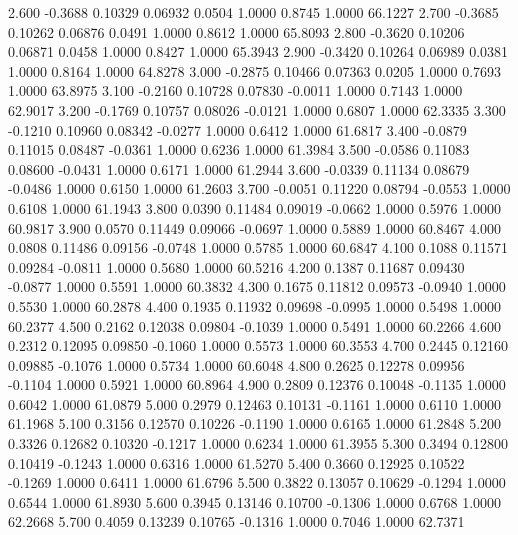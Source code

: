    2.600  -0.3688   0.10329   0.06932   0.0504   1.0000   0.8745   1.0000  66.1227
   2.700  -0.3685   0.10262   0.06876   0.0491   1.0000   0.8612   1.0000  65.8093
   2.800  -0.3620   0.10206   0.06871   0.0458   1.0000   0.8427   1.0000  65.3943
   2.900  -0.3420   0.10264   0.06989   0.0381   1.0000   0.8164   1.0000  64.8278
   3.000  -0.2875   0.10466   0.07363   0.0205   1.0000   0.7693   1.0000  63.8975
   3.100  -0.2160   0.10728   0.07830  -0.0011   1.0000   0.7143   1.0000  62.9017
   3.200  -0.1769   0.10757   0.08026  -0.0121   1.0000   0.6807   1.0000  62.3335
   3.300  -0.1210   0.10960   0.08342  -0.0277   1.0000   0.6412   1.0000  61.6817
   3.400  -0.0879   0.11015   0.08487  -0.0361   1.0000   0.6236   1.0000  61.3984
   3.500  -0.0586   0.11083   0.08600  -0.0431   1.0000   0.6171   1.0000  61.2944
   3.600  -0.0339   0.11134   0.08679  -0.0486   1.0000   0.6150   1.0000  61.2603
   3.700  -0.0051   0.11220   0.08794  -0.0553   1.0000   0.6108   1.0000  61.1943
   3.800   0.0390   0.11484   0.09019  -0.0662   1.0000   0.5976   1.0000  60.9817
   3.900   0.0570   0.11449   0.09066  -0.0697   1.0000   0.5889   1.0000  60.8467
   4.000   0.0808   0.11486   0.09156  -0.0748   1.0000   0.5785   1.0000  60.6847
   4.100   0.1088   0.11571   0.09284  -0.0811   1.0000   0.5680   1.0000  60.5216
   4.200   0.1387   0.11687   0.09430  -0.0877   1.0000   0.5591   1.0000  60.3832
   4.300   0.1675   0.11812   0.09573  -0.0940   1.0000   0.5530   1.0000  60.2878
   4.400   0.1935   0.11932   0.09698  -0.0995   1.0000   0.5498   1.0000  60.2377
   4.500   0.2162   0.12038   0.09804  -0.1039   1.0000   0.5491   1.0000  60.2266
   4.600   0.2312   0.12095   0.09850  -0.1060   1.0000   0.5573   1.0000  60.3553
   4.700   0.2445   0.12160   0.09885  -0.1076   1.0000   0.5734   1.0000  60.6048
   4.800   0.2625   0.12278   0.09956  -0.1104   1.0000   0.5921   1.0000  60.8964
   4.900   0.2809   0.12376   0.10048  -0.1135   1.0000   0.6042   1.0000  61.0879
   5.000   0.2979   0.12463   0.10131  -0.1161   1.0000   0.6110   1.0000  61.1968
   5.100   0.3156   0.12570   0.10226  -0.1190   1.0000   0.6165   1.0000  61.2848
   5.200   0.3326   0.12682   0.10320  -0.1217   1.0000   0.6234   1.0000  61.3955
   5.300   0.3494   0.12800   0.10419  -0.1243   1.0000   0.6316   1.0000  61.5270
   5.400   0.3660   0.12925   0.10522  -0.1269   1.0000   0.6411   1.0000  61.6796
   5.500   0.3822   0.13057   0.10629  -0.1294   1.0000   0.6544   1.0000  61.8930
   5.600   0.3945   0.13146   0.10700  -0.1306   1.0000   0.6768   1.0000  62.2668
   5.700   0.4059   0.13239   0.10765  -0.1316   1.0000   0.7046   1.0000  62.7371
